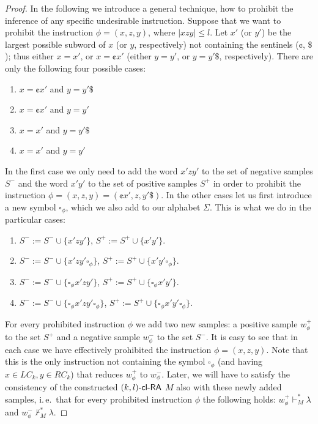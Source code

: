\begin{proof}
In the following we introduce a general technique, how to prohibit the 
inference of any specific undesirable instruction.
Suppose that we want to prohibit the instruction $\phi = (x, z, y)$,
where $|xzy| \le l$.
Let $x'$ (or $y'$) be the largest possible subword of $x$
(or $y$, respectively) not containing the sentinels ($\cent$, $\$$); thus
either $x = x'$, or $x = \cent x'$ (either $y = y'$, or $y = y'\$$, 
respectively). 
There are only the following four possible cases:
\begin{enumerate}
\item $x = \cent x'$ and $y = y' \$$
\item $x = \cent x'$ and $y = y'$
\item $x = x'$ and $y = y' \$$
\item $x = x'$ and $y = y'$
\end{enumerate}
In the first case we only need to add 
the word $x'zy'$ to the set of negative samples $S^-$ and
the word $x'y'$ to the set of positive samples $S^+$ in order to 
prohibit the instruction $\phi = (x, z, y) = (\cent x', z, y' \$)$.
In the other cases let us first introduce a new symbol $\square_{\phi}$, 
which we also add to our alphabet $\Sigma$.
This is what we do in the particular cases:
\begin{enumerate}
\item $S^- := S^- \cup \{ x'zy' \}$,
$S^+ := S^+ \cup \{  x'y' \}$.
\item $S^- := S^- \cup \{ x'zy'  \square_{\phi} \}$, 
$S^+ := S^+ \cup \{  x'y'  \square_{\phi} \}$.
\item $S^- := S^- \cup \{ \square_{\phi} x'zy' \}$, 
$S^+ := S^+ \cup \{ \square_{\phi} x'y' \}$.
\item $S^- := S^- \cup \{ \square_{\phi} x'zy' \square_{\phi} \}$, 
$S^+ := S^+ \cup \{ \square_{\phi} x'y' \square_{\phi} \}$.
\end{enumerate}
For every prohibited instruction $\phi$ we add two new samples:
a positive sample $w_{\phi}^+$ to the set $S^+$ and a negative
sample $w_{\phi}^-$ to the set $S^-$. 
It is easy to see that in each case we have effectively prohibited
the instruction $\phi = (x, z, y)$. Note that this is the only instruction
not containing the symbol $\square_{\phi}$ (and
having $x \in LC_k, y \in RC_k$) 
that reduces $w_{\phi}^+$ to $w_{\phi}^-$.
Later, we will have to satisfy the consistency of 
the constructed $\textup{\sf $(k,l)$-\textup{\sf cl-RA\/}}$ $M$ also with these newly added samples, i.\,e.\ that for 
every prohibited instruction $\phi$ the following holds:
$w_{\phi}^+ \vdash_M^* \lambda$ and $w_{\phi}^- \not\vdash_M^* \lambda$.

\end{proof}
